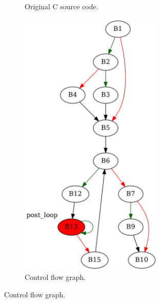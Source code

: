 \begin{figure}[htbp]
	\centering
	\begin{subfigure}[b]{0.30\textwidth}
		\centering
		
		\caption{Original C source code.}
	\end{subfigure}
	\begin{subfigure}[b]{0.50\textwidth}
		\centering
		\includegraphics[width=0.75\textwidth]{inc/appendices/examples/interval/example/sample/f_0002a.png}
		\caption{Control flow graph.}
	\end{subfigure}
\end{figure}

